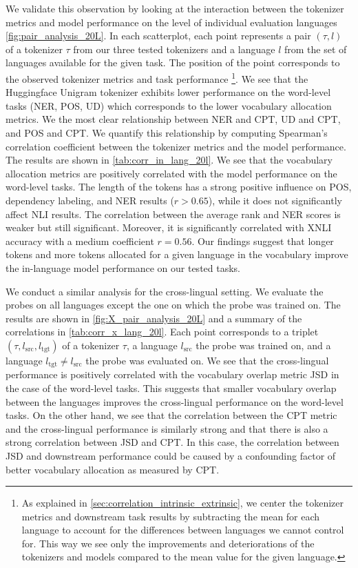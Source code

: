 We validate this observation by looking at the interaction between the tokenizer metrics and model performance on the level of individual evaluation languages \autoref{fig:pair_analysis_20L}. In each scatterplot, each point represents a pair $(\tau, l)$ of a tokenizer $\tau$ from our three tested tokenizers and a language $l$ from the set of languages available for the given task. The position of the point corresponds to the observed tokenizer metrics and task performance \footnote{As explained in \autoref{sec:correlation_intrinsic_extrinsic}, we center the tokenizer metrics and downstream task results by subtracting the mean for each language to account for the differences between languages we cannot control for. This way we see only the improvements and deteriorations of the tokenizers and models compared to the mean value for the given language.}.
  We see that the Huggingface Unigram tokenizer exhibits lower performance on the word-level tasks (NER, POS, UD) which corresponds to the lower vocabulary allocation metrics. We the most clear relationship between NER and CPT, UD and CPT, and POS and CPT. We quantify this relationship by computing Spearman's correlation coefficient between the tokenizer metrics and the model performance. The results are shown in \autoref{tab:corr_in_lang_20l}. We see that the vocabulary allocation metrics are positively correlated with the model performance on the word-level tasks. The length of the tokens has a strong positive influence on POS, dependency labeling, and NER results ($r > 0.65$), while it does not significantly affect NLI results. The correlation between the average rank and NER scores is weaker but still significant. Moreover, it is significantly correlated with XNLI accuracy with a medium coefficient $r = 0.56$. Our findings suggest that longer tokens and more tokens allocated for a given language in the vocabulary improve the in-language model performance on our tested tasks. 

We conduct a similar analysis for the cross-lingual setting. We evaluate the probes on all languages except the one on which the probe was trained on. The results are shown in \autoref{fig:X_pair_analysis_20L} and a summary of the correlations in \autoref{tab:corr_x_lang_20l}. Each point corresponds to a triplet $(\tau, l_\mathrm{src}, l_\mathrm{tgt})$ of a tokenizer $\tau$, a language $l_\mathrm{src}$ the probe was trained on, and a language $l_\mathrm{tgt} \neq l_\mathrm{src}$ the probe was evaluated on. We see that the cross-lingual performance is positively correlated with the vocabulary overlap metric JSD in the case of the word-level tasks. This suggests that smaller vocabulary overlap between the languages improves the cross-lingual performance on the word-level tasks. On the other hand, we see that the correlation between the CPT metric and the cross-lingual performance is similarly strong and that there is also a strong correlation between JSD and CPT. In this case, the correlation between JSD and downstream performance could be caused by a confounding factor of better vocabulary allocation as measured by CPT.

